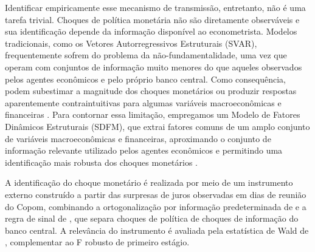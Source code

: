 \documentclass[preprint,authoryear,review,12pt]{elsarticle}
\begin{document}
Identificar empiricamente esse mecanismo de transmissão, entretanto, não é uma tarefa trivial. Choques de política monetária não são diretamente observáveis e sua identificação depende da informação disponível ao econometrista. Modelos tradicionais, como os Vetores Autorregressivos Estruturais (SVAR), frequentemente sofrem do problema da não-fundamentalidade, uma vez que operam com conjuntos de informação muito menores do que aqueles observados pelos agentes econômicos e pelo próprio banco central. Como consequência, podem subestimar a magnitude dos choques monetários ou produzir respostas aparentemente contraintuitivas para algumas variáveis macroeconômicas e financeiras \citep[]{villaverde, alessi}. Para contornar essa limitação, empregamos um Modelo de Fatores Dinâmicos Estruturais (SDFM), que extrai fatores comuns de um amplo conjunto de variáveis macroeconômicas e financeiras, aproximando o conjunto de informação relevante utilizado pelos agentes econômicos e permitindo uma identificação mais robusta dos choques monetários \citep[]{STOCK2016415, alessi}.


A identificação do choque monetário é realizada por meio de um instrumento externo construído a partir das surpresas de juros observadas em dias de reunião do Copom, combinando a ortogonalização por informação predeterminada de \cite{bauer2023} e a regra de sinal de \cite{jarocinski2020}, que separa choques de política de choques de informação do banco central. A relevância do instrumento é avaliada pela estatística de Wald de \cite{montielolea}, complementar ao F robusto de primeiro estágio.
\end{document}
